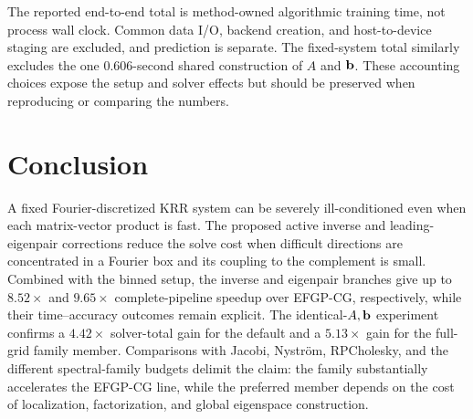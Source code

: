 The reported end-to-end total is method-owned algorithmic training time, not
process wall clock.  Common data I/O, backend creation, and host-to-device
staging are excluded, and prediction is separate.  The fixed-system total
similarly excludes the one \(0.606\)-second shared construction of
\(A\) and \(\mathbf b\).  These accounting choices expose the setup and solver
effects but should be preserved when reproducing or comparing the numbers.

\section{Conclusion}
\label{sec:conclusion}

A fixed Fourier-discretized KRR system can be severely ill-conditioned even
when each matrix-vector product is fast.  The proposed active inverse and
leading-eigenpair corrections reduce the solve cost when difficult directions
are concentrated in a Fourier box and its coupling to the complement is
small.  Combined with the binned setup, the inverse and eigenpair branches
give up to \(8.52\times\) and \(9.65\times\) complete-pipeline speedup over
EFGP-CG, respectively, while their time--accuracy outcomes remain explicit.
The identical-\(A,\mathbf b\) experiment confirms a \(4.42\times\)
solver-total gain for the default and a \(5.13\times\) gain for the full-grid
family member.  Comparisons with Jacobi, Nystr\"om, RPCholesky, and the
different spectral-family budgets delimit the claim: the family substantially
accelerates the EFGP-CG line, while the preferred member depends on the cost of
localization, factorization, and global eigenspace construction.
